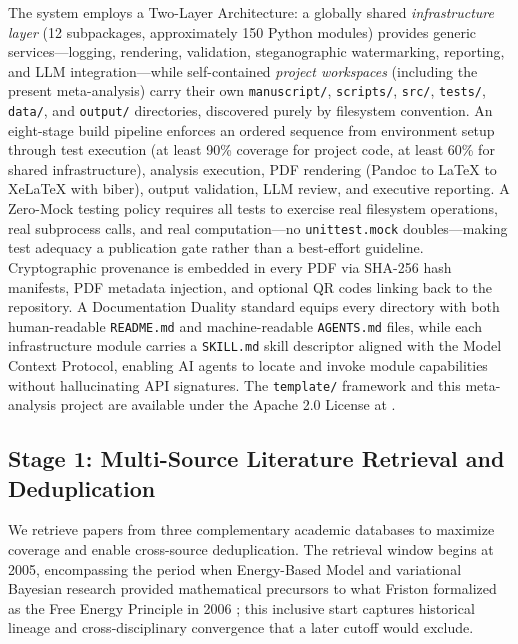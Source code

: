 \documentclass[
  english,
]{article}
\begin{document}
The system employs a Two-Layer Architecture: a globally shared
\emph{infrastructure layer} (12 subpackages, approximately 150 Python
modules) provides generic services---logging, rendering, validation,
steganographic watermarking, reporting, and LLM integration---while
self-contained \emph{project workspaces} (including the present
meta-analysis) carry their own \texttt{manuscript/}, \texttt{scripts/},
\texttt{src/}, \texttt{tests/}, \texttt{data/}, and \texttt{output/}
directories, discovered purely by filesystem convention. An eight-stage
build pipeline enforces an ordered sequence from environment setup
through test execution (at least 90\% coverage for project code, at
least 60\% for shared infrastructure), analysis execution, PDF rendering
(Pandoc to LaTeX to XeLaTeX with biber), output validation, LLM review,
and executive reporting. A Zero-Mock testing policy requires all tests
to exercise real filesystem operations, real subprocess calls, and real
computation---no \texttt{unittest.mock} doubles---making test adequacy a
publication gate rather than a best-effort guideline. Cryptographic
provenance is embedded in every PDF via SHA-256 hash manifests, PDF
metadata injection, and optional QR codes linking back to the
repository. A Documentation Duality standard equips every directory with
both human-readable \texttt{README.md} and machine-readable
\texttt{AGENTS.md} files, while each infrastructure module carries a
\texttt{SKILL.md} skill descriptor aligned with the Model Context
Protocol, enabling AI agents to locate and invoke module capabilities
without hallucinating API signatures. The \texttt{template/} framework
and this meta-analysis project are available under the Apache 2.0
License at
.

\newpage

\subsection{\texorpdfstring{Stage 1: Multi-Source Literature Retrieval
and Deduplication
\label{sec:methods_retrieval}}{Stage 1: Multi-Source Literature Retrieval and Deduplication}}\label{stage-1-multi-source-literature-retrieval-and-deduplication}

We retrieve papers from three complementary academic databases to
maximize coverage and enable cross-source deduplication. The retrieval
window begins at 2005, encompassing the period when Energy-Based Model
and variational Bayesian research
\citep{dayan1995helmholtz, lecun2006tutorial} provided mathematical
precursors to what Friston formalized as the Free Energy Principle in
2006 \citep{friston2006free}; this inclusive start captures historical
lineage and cross-disciplinary convergence that a later cutoff would
exclude.
\end{document}
